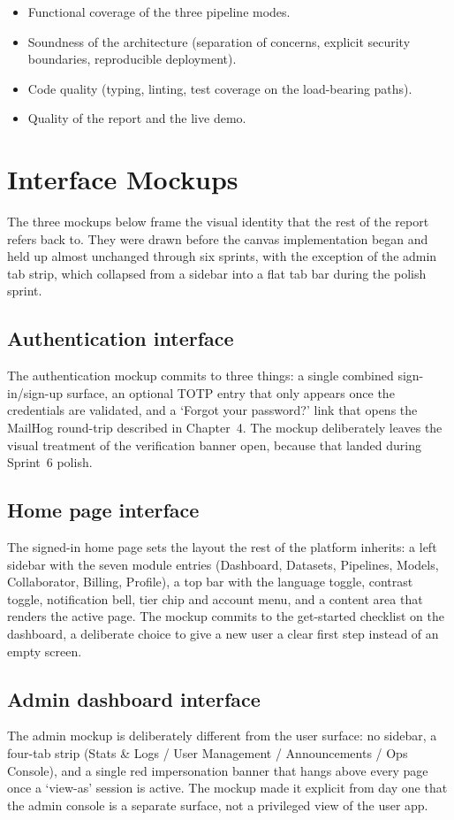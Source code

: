 \documentclass[12pt, a4paper, oneside]{report}
\begin{document}
\begin{itemize}
    \item Functional coverage of the three pipeline modes.
    \item Soundness of the architecture (separation of concerns,
        explicit security boundaries, reproducible deployment).
    \item Code quality (typing, linting, test coverage on the
        load-bearing paths).
    \item Quality of the report and the live demo.
\end{itemize}

\section{Interface Mockups}

The three mockups below frame the visual identity that the rest of
the report refers back to. They were drawn before the canvas
implementation began and held up almost unchanged through six
sprints, with the exception of the admin tab strip, which collapsed
from a sidebar into a flat tab bar during the polish sprint.

\subsection{Authentication interface}
The authentication mockup commits to three things: a single combined
sign-in/sign-up surface, an optional TOTP entry that only appears
once the credentials are validated, and a `Forgot your password?'
link that opens the MailHog round-trip described in Chapter~4. The
mockup deliberately leaves the visual treatment of the verification
banner open, because that landed during Sprint~6 polish.

\subsection{Home page interface}
The signed-in home page sets the layout the rest of the platform
inherits: a left sidebar with the seven module entries (Dashboard,
Datasets, Pipelines, Models, Collaborator, Billing, Profile), a
top bar with the language toggle, contrast toggle, notification
bell, tier chip and account menu, and a content area that
renders the active page. The mockup commits to the get-started
checklist on the dashboard, a deliberate choice to give a new user a
clear first step instead of an empty screen.

\subsection{Admin dashboard interface}
The admin mockup is deliberately different from the user surface:
no sidebar, a four-tab strip (Stats \& Logs / User Management /
Announcements / Ops Console), and a single red impersonation
banner that hangs above every page once a `view-as' session is
active. The mockup made it explicit from day one that the admin
console is a separate surface, not a privileged view of the user
app.
\end{document}
